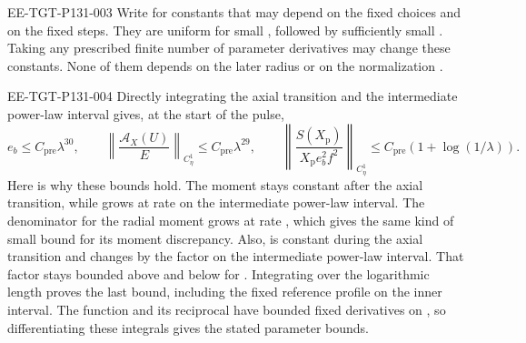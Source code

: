 \begin{EESegment}{EE-TGT-P131-003}
Write  for constants that may depend on the fixed
choices  and on the fixed steps. They are uniform for
small , followed by sufficiently small
. Taking any prescribed finite number of parameter derivatives
may change these constants. None of them depends on the later radius
 or on the normalization
.
\end{EESegment}

\begin{EESegment}{EE-TGT-P131-004}
Directly integrating the axial transition and the intermediate power-law interval gives, at
the start of the pulse,
\begin{equation}
e_b\le C_{\mathrm{pre}}\lambda^{30},
\qquad
\left\lVert\frac{\mathcal A_X(U)}{E}\right\rVert_{C_\eta^1}
 \le C_{\mathrm{pre}}\lambda^{29},
\qquad
\left\lVert\frac{S(X_{\mathrm p})}{X_{\mathrm p}e_b^2f^2}\right\rVert_{C_\eta^1}
 \le C_{\mathrm{pre}}(1+\log(1/\lambda)).
\tag{A.14}\label{eq:A.14}
\end{equation}
Here is why these bounds hold. The moment  stays constant after
the axial transition, while  grows at rate
 on the intermediate power-law interval. The
denominator  for the
 radial moment grows at rate
, which
gives the same kind of small bound for its moment discrepancy. Also,
 is constant during the axial transition and changes by the
factor  on the intermediate power-law interval.
That factor stays bounded above and below for .
Integrating over the logarithmic length proves the last bound, including the fixed reference
profile on the inner interval. The function  and its reciprocal
have bounded fixed derivatives on , so differentiating these
integrals gives the stated parameter bounds.
\end{EESegment}


